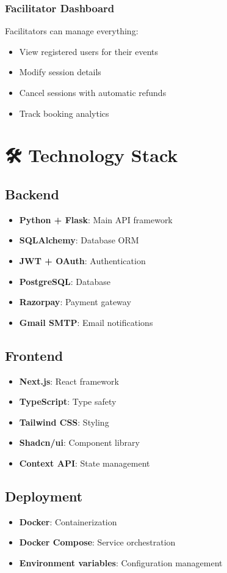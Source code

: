 \documentclass[12pt,a4paper]{article}
\begin{document}
\subsubsection{Facilitator Dashboard}
Facilitators can manage everything:
\begin{itemize}
    \item View registered users for their events
    \item Modify session details
    \item Cancel sessions with automatic refunds
    \item Track booking analytics
\end{itemize}

\section{🛠️ Technology Stack}

\subsection{Backend}
\begin{itemize}
    \item \textbf{Python + Flask}: Main API framework
    \item \textbf{SQLAlchemy}: Database ORM
    \item \textbf{JWT + OAuth}: Authentication
    \item \textbf{PostgreSQL}: Database
    \item \textbf{Razorpay}: Payment gateway
    \item \textbf{Gmail SMTP}: Email notifications
\end{itemize}

\subsection{Frontend}
\begin{itemize}
    \item \textbf{Next.js}: React framework
    \item \textbf{TypeScript}: Type safety
    \item \textbf{Tailwind CSS}: Styling
    \item \textbf{Shadcn/ui}: Component library
    \item \textbf{Context API}: State management
\end{itemize}

\subsection{Deployment}
\begin{itemize}
    \item \textbf{Docker}: Containerization
    \item \textbf{Docker Compose}: Service orchestration
    \item \textbf{Environment variables}: Configuration management
\end{itemize}
\end{document}
